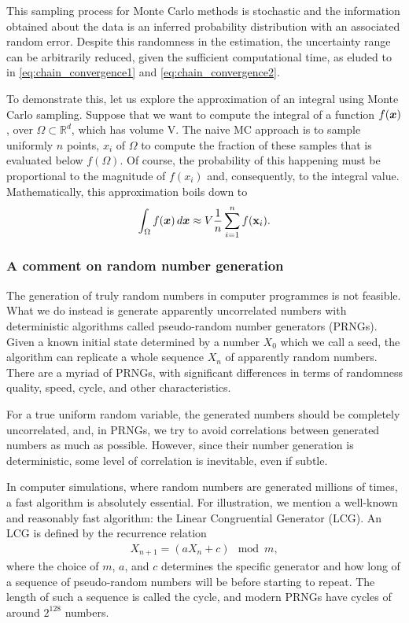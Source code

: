 This sampling process for Monte Carlo methods is stochastic and the information obtained about the data is an inferred probability distribution with an associated random error. Despite this randomness in the estimation, the uncertainty range can be arbitrarily reduced, given the sufficient computational time, as eluded to in \eqref{eq:chain_convergence1} and \eqref{eq:chain_convergence2}.
 
To demonstrate this, let us explore the approximation of an integral using Monte Carlo sampling. Suppose that we want to compute the integral of a function $f(\boldsymbol{x})$, over $\Omega \subset \mathbb{R}^d$, which has volume V. The naive MC approach is to sample uniformly $n$ points, $x_i$ of $\Omega$ to compute the fraction of these samples that is evaluated below $f(\Omega)$. Of course, the probability of this happening must be proportional to the magnitude of $f(x_i)$ and, consequently, to the integral value. Mathematically, this approximation boils down to
\begin{align}
    \int_\Omega f(\boldsymbol{x})\,d\boldsymbol{x} \approx V \frac{1}{n}\sum_{i=1}^{n} f(\displaystyle {\mathbf{x}}_i).
    \label{eq:mc_integration}
\end{align}

\subsubsection{A comment on random number generation}
The generation of truly random numbers in computer programmes is not feasible. What we do instead is generate apparently uncorrelated numbers with deterministic algorithms called pseudo-random number generators (PRNGs). Given a known initial state determined by a number $X_0$ which we call a seed, the algorithm can replicate a whole sequence $X_n$ of apparently random numbers. There are a myriad of PRNGs, with significant differences in terms of randomness quality, speed, cycle, and other characteristics. 

For a true uniform random variable, the generated numbers should be completely uncorrelated, and, in PRNGs, we try to avoid correlations between generated numbers as much as possible. However, since their number generation is deterministic, some level of correlation is inevitable, even if subtle.

In computer simulations, where random numbers are generated millions of times, a fast algorithm is absolutely essential. For illustration, we mention a well-known and reasonably fast algorithm: the Linear Congruential Generator (LCG). An LCG is defined by the recurrence relation
\begin{align*}
    X_{n+1} = (aX_n + c) \mod m,
\end{align*}
where the choice of $m$, $a$, and $c$ determines the specific generator and how long of a sequence of pseudo-random numbers will be before starting to repeat. The length of such a sequence is called the cycle, and modern PRNGs have cycles of around $2^{128}$ numbers.

